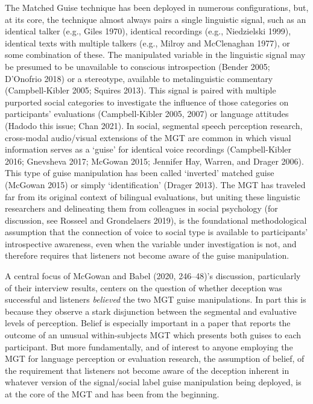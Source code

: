 \documentclass[
  letterpaper,
  DIV=11,
  numbers=noendperiod]{scrartcl}
\begin{document}
The Matched Guise technique has been deployed in numerous
configurations, but, at its core, the technique almost always pairs a
single linguistic signal, such as an identical talker (e.g., Giles
1970), identical recordings (e.g., Niedzielski 1999), identical texts
with multiple talkers (e.g., Milroy and McClenaghan 1977), or some
combination of these. The manipulated variable in the linguistic signal
may be presumed to be unavailable to conscious introspection (Bender
2005; D'Onofrio 2018) or a stereotype, available to metalinguistic
commentary (Campbell-Kibler 2005; Squires 2013). This signal is paired
with multiple purported social categories to investigate the influence
of those categories on participants' evaluations (Campbell-Kibler 2005,
2007) or language attitudes (Hadodo this issue; Chan 2021). In social,
segmental speech perception research, cross-modal audio/visual
extensions of the MGT are common in which visual information serves as a
`guise' for identical voice recordings (Campbell-Kibler 2016; Gnevsheva
2017; McGowan 2015; Jennifer Hay, Warren, and Drager 2006). This type of
guise manipulation has been called `inverted' matched guise (McGowan
2015) or simply `identification' (Drager 2013). The MGT has traveled far
from its original context of bilingual evaluations, but uniting these
linguistic researchers and delineating them from colleagues in social
psychology (for discussion, see Rosseel and Grondelaers 2019), is the
foundational methodological assumption that the connection of voice to
social type is available to participants' introspective awareness, even
when the variable under investigation is not, and therefore requires
that listeners not become aware of the guise manipulation.

A central focus of McGowan and Babel (2020, 246--48)'s discussion,
particularly of their interview results, centers on the question of
whether deception was successful and listeners \emph{believed} the two
MGT guise manipulations. In part this is because they observe a stark
disjunction between the segmental and evaluative levels of perception.
Belief is especially important in a paper that reports the outcome of an
unusual within-subjects MGT which presents both guises to each
participant. But more fundamentally, and of interest to anyone employing
the MGT for language perception or evaluation research, the assumption
of belief, of the requirement that listeners not become aware of the
deception inherent in whatever version of the signal/social label guise
manipulation being deployed, is at the core of the MGT and has been from
the beginning.
\end{document}
